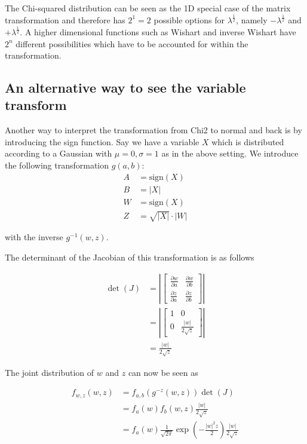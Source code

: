 The Chi-squared distribution can be seen as the 1D special case of the matrix transformation and therefore has $2^1=2$ possible options for $\lambda^{\frac{1}{2}}$, namely $-\lambda^{\frac{1}{2}}$ and $+\lambda^{\frac{1}{2}}$. A higher dimensional functions such as Wishart and inverse Wishart have $2^n$ different possibilities which have to be accounted for within the transformation. 

\subsection*{An alternative way to see the variable transform}

Another way to interpret the transformation from Chi2 to normal and back is by introducing the sign function. Say we have a variable $X$ which is distributed according to a Gaussian with $\mu=0, \sigma=1$ as in the above setting. We introduce the following transformation $g(a,b)$:
\begin{align*}
	A &= \text{sign}(X) \\
	B &= |X| \\
	W &= \text{sign}(X) \\
	Z &= \sqrt{|X|} \cdot |W|
\end{align*}

with the inverse $g^{-1}(w,z)$.

The determinant of the Jacobian of this transformation is as follows

\begin{align*}
	\det(J) &= \left|\begin{bmatrix}
		\frac{\partial w}{\partial a} & \frac{\partial w}{\partial b} \\
		\frac{\partial z}{\partial a} & \frac{\partial z}{\partial b}
	\end{bmatrix}\right| \\
	&= \left|\begin{bmatrix}
	1 & 0 \\
	0 & \frac{|w|}{2\sqrt{z}}
	\end{bmatrix}\right| \\
	&= \frac{|w|}{2\sqrt{z}}
\end{align*}

The joint distribution of $w$ and $z$ can now be seen as 

\begin{align*}
		f_{w,z}(w,z) &= f_{a,b}(g^{-z}(w,z)) \det(J) \\
		&= f_a(w) f_b(w,z) \frac{|w|}{2\sqrt{z}} \\
		&= f_a(w) \frac{1}{\sqrt{2\pi}} \exp\left(-\frac{|w|^2 z}{2}\right) \frac{|w|}{2\sqrt{z}} \\
\end{align*}


